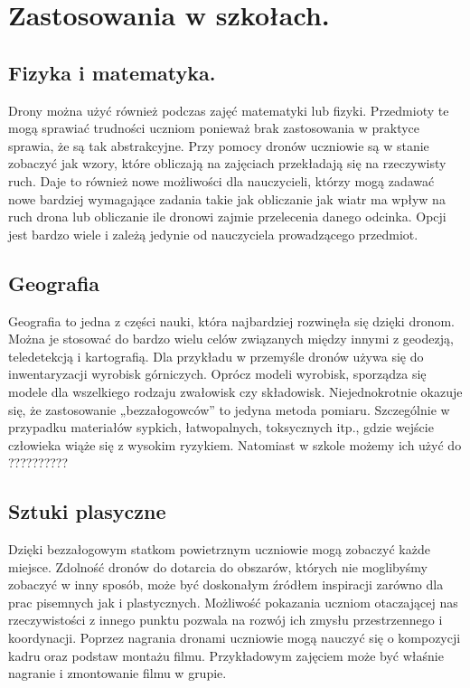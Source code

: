 \documentclass{article}
\begin{document}
\section{Zastosowania w szkołach.}

\subsection{Fizyka i matematyka.}

Drony można użyć również podczas zajęć matematyki lub fizyki. Przedmioty te mogą sprawiać trudności uczniom ponieważ brak zastosowania w praktyce sprawia, że są tak abstrakcyjne. Przy pomocy dronów uczniowie są w stanie zobaczyć jak wzory, które obliczają na zajęciach przekładają się na rzeczywisty ruch. Daje to również nowe możliwości dla nauczycieli, którzy mogą zadawać nowe bardziej wymagające zadania takie jak obliczanie jak wiatr ma wpływ na ruch drona lub obliczanie ile dronowi zajmie przelecenia danego odcinka. Opcji jest bardzo wiele i zależą jedynie od nauczyciela prowadzącego przedmiot.

\subsection{Geografia}

Geografia to jedna z części nauki, która najbardziej rozwinęła się dzięki dronom. Można je stosować do bardzo wielu celów związanych między innymi z geodezją, teledetekcją i kartografią. Dla przykładu w przemyśle dronów używa się do inwentaryzacji wyrobisk górniczych. Oprócz modeli wyrobisk, sporządza się modele dla wszelkiego rodzaju zwałowisk czy składowisk. Niejednokrotnie okazuje się, że zastosowanie „bezzałogowców” to jedyna metoda pomiaru. Szczególnie w przypadku materiałów sypkich, łatwopalnych, toksycznych itp., gdzie wejście człowieka wiąże się z wysokim ryzykiem. Natomiast w szkole możemy ich użyć do ??????????

\subsection{Sztuki plasyczne}

Dzięki bezzałogowym statkom powietrznym uczniowie mogą zobaczyć każde miejsce. Zdolność dronów do dotarcia do obszarów, których nie moglibyśmy zobaczyć w inny sposób, może być doskonałym źródłem inspiracji zarówno dla prac pisemnych jak i plastycznych. Możliwość pokazania uczniom otaczającej nas rzeczywistości z innego punktu pozwala na rozwój ich zmysłu przestrzennego i koordynacji. Poprzez nagrania dronami uczniowie mogą nauczyć się o kompozycji kadru oraz podstaw montażu filmu. Przykładowym zajęciem może być właśnie nagranie i zmontowanie filmu w grupie.
\end{document}
